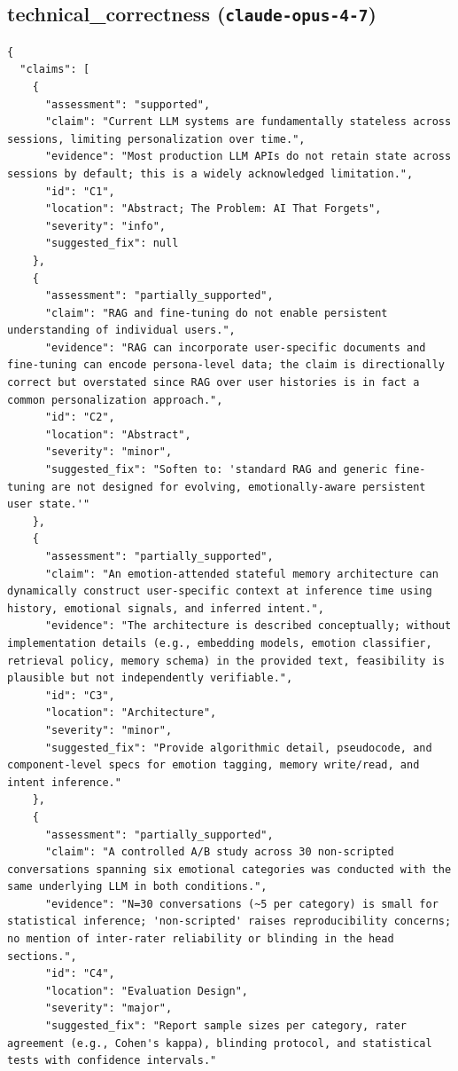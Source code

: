 \documentclass[11pt]{article}
\begin{document}
\subsection*{technical_correctness (\texttt{claude-opus-4-7})}
\begin{verbatim}
{
  "claims": [
    {
      "assessment": "supported",
      "claim": "Current LLM systems are fundamentally stateless across sessions, limiting personalization over time.",
      "evidence": "Most production LLM APIs do not retain state across sessions by default; this is a widely acknowledged limitation.",
      "id": "C1",
      "location": "Abstract; The Problem: AI That Forgets",
      "severity": "info",
      "suggested_fix": null
    },
    {
      "assessment": "partially_supported",
      "claim": "RAG and fine-tuning do not enable persistent understanding of individual users.",
      "evidence": "RAG can incorporate user-specific documents and fine-tuning can encode persona-level data; the claim is directionally correct but overstated since RAG over user histories is in fact a common personalization approach.",
      "id": "C2",
      "location": "Abstract",
      "severity": "minor",
      "suggested_fix": "Soften to: 'standard RAG and generic fine-tuning are not designed for evolving, emotionally-aware persistent user state.'"
    },
    {
      "assessment": "partially_supported",
      "claim": "An emotion-attended stateful memory architecture can dynamically construct user-specific context at inference time using history, emotional signals, and inferred intent.",
      "evidence": "The architecture is described conceptually; without implementation details (e.g., embedding models, emotion classifier, retrieval policy, memory schema) in the provided text, feasibility is plausible but not independently verifiable.",
      "id": "C3",
      "location": "Architecture",
      "severity": "minor",
      "suggested_fix": "Provide algorithmic detail, pseudocode, and component-level specs for emotion tagging, memory write/read, and intent inference."
    },
    {
      "assessment": "partially_supported",
      "claim": "A controlled A/B study across 30 non-scripted conversations spanning six emotional categories was conducted with the same underlying LLM in both conditions.",
      "evidence": "N=30 conversations (~5 per category) is small for statistical inference; 'non-scripted' raises reproducibility concerns; no mention of inter-rater reliability or blinding in the head sections.",
      "id": "C4",
      "location": "Evaluation Design",
      "severity": "major",
      "suggested_fix": "Report sample sizes per category, rater agreement (e.g., Cohen's kappa), blinding protocol, and statistical tests with confidence intervals."

\end{verbatim}
\end{document}
